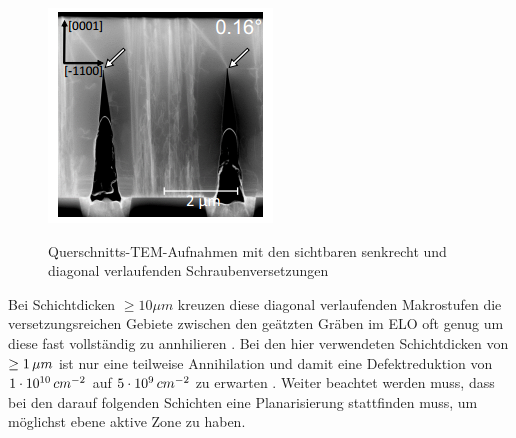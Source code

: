 \begin{figure}[htb]
\begin{minipage}[t]{0.49\textwidth}
    \includegraphics[width=\linewidth]{Bilder/offcutdiagonal.png}
    \label{}
  \end{minipage}
	\caption{Querschnitts-TEM-Aufnahmen mit den sichtbaren senkrecht und diagonal verlaufenden Schraubenversetzungen}
\end{figure}
%
Bei Schichtdicken $ \geq 10 \mu m $ kreuzen diese diagonal verlaufenden Makrostufen die versetzungsreichen Gebiete zwischen den geätzten Gräben im ELO oft genug um diese fast vollständig zu annhilieren \cite{fmehnke}. Bei den hier verwendeten Schichtdicken von $ \geq 1 \thinspace \mu m $ ist nur eine teilweise Annihilation und damit eine Defektreduktion von $1\cdot 10^{10} \thinspace cm^{-2}$ auf $5\cdot 10^9 \thinspace cm^{-2}$ zu erwarten \cite{fmehnke}. Weiter beachtet werden muss, dass bei den darauf folgenden Schichten eine Planarisierung stattfinden muss, um möglichst ebene aktive Zone zu haben. 


